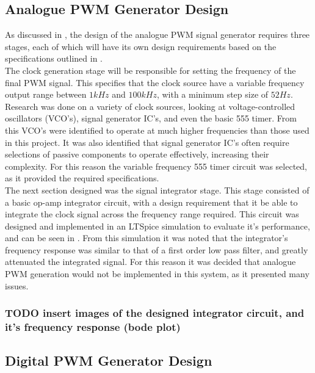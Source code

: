 \subsection{Analogue PWM Generator Design}\label{S:analogue_design}

As discussed in , the design of the analogue PWM signal generator requires three stages, each of which will have its own design requirements based on the specifications outlined in . \\

The clock generation stage will be responsible for setting the frequency of the final PWM signal. This specifies that the clock source have a variable frequency output range between $1kHz$ and $100kHz$, with a minimum step size of $52Hz$. Research was done on a variety of clock sources, looking at voltage-controlled oscillators (VCO's), signal generator IC's, and even the basic 555 timer. From this VCO's were identified to operate at much higher frequencies than those used in this project. It was also identified that signal generator IC's often require selections of passive components to operate effectively, increasing their complexity. For this reason the variable frequency 555 timer circuit was selected, as it provided the required specifications.\\

The next section designed was the signal integrator stage. This stage consisted of a basic op-amp integrator circuit, with a design requirement that it be able to integrate the clock signal across the frequency range required. This circuit was designed and implemented in an LTSpice simulation to evaluate it's performance, and can be seen in . From this simulation it was noted that the integrator's frequency response was similar to that of a first order low pass filter, and greatly attenuated the integrated signal. For this reason it was decided that analogue PWM generation would not be implemented in this system, as it presented many issues.

\subsubsection{TODO insert images of the designed integrator circuit, and it's frequency response (bode plot)} 

\subsection{Digital PWM Generator Design}\label{S:digital_design}

